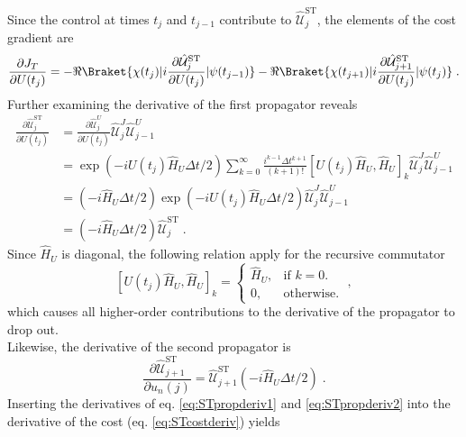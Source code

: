 Since the control at times $t_j$ and $t_{j-1}$ contribute to $\hat{\mathcal{U}}_{j}^{\mathrm{ST}}$, the elements of the cost gradient are
\begin{equation}
	\frac{\partial J_T}{\partial U (t_j)} = - \Re \Braket{\chi (t_j) | i  \frac{\partial \hat{\mathcal{U}}_{j}^{\mathrm{ST}}}{\partial U (t_j)} | \psi (t_{j-1})} - \Re \Braket{\chi (t_{j+1}) | i \frac{ \partial \hat{\mathcal{U}}_{j+1}^{\mathrm{ST}}}{\partial U (t_j)} | \psi (t_{j})} \; . \label{eq:STcostderiv}
\end{equation}
Further examining the derivative of the first propagator reveals
\begin{align}
	\frac{\partial \hat{\mathcal{U}}_{j}^{\mathrm{ST}}}{\partial U (t_j)} &=  \frac{\partial \hat{\mathcal{U}}_{j}^{U}}{\partial U (t_j)} \hat{\mathcal{U}}_{j}^{J} \hat{\mathcal{U}}_{j-1}^{U} \nonumber \\
	&=  \exp \left( -i U (t_j) \hat{H}_U  \Delta t /2 \right)  \sum_{k = 0}^{\infty }  \frac{i^{k-1} \Delta t^{k+1}}{(k+1)!} \left[ U (t_j) \hat{H}_U  ,  \hat{H}_U \right]_k \hat{\mathcal{U}}_{j}^{J} \hat{\mathcal{U}}_{j-1}^{U} \nonumber \\
	&= \left( -i \hat{H}_U \Delta t /2 \right) \exp \left( -i U(t_j) \hat{H}_U  \Delta t /2 \right)   \hat{\mathcal{U}}_{j}^{J} \hat{\mathcal{U}}_{j-1}^{U} \nonumber \\
	&= \left( -i \hat{H}_U \Delta t /2 \right) \hat{\mathcal{U}}_{j}^{\mathrm{ST}} \; . \label{eq:STpropderiv1}
\end{align}
Since $\hat{H}_U$ is diagonal, the following relation apply for the recursive commutator 
\begin{equation}
	\left[ U (t_j) \hat{H}_U  ,  \hat{H}_U \right]_k =  
	\begin{cases}
    	\hat{H}_U, & \text{if $k = 0$}.\\
    	0, & \text{otherwise}.
  	\end{cases} \; ,
\end{equation}  
which causes all higher-order contributions to the derivative of the propagator to drop out.\\
Likewise, the derivative of the second propagator is
\begin{equation}
	\frac{\partial \hat{\mathcal{U}}_{j+1}^{\mathrm{ST}}}{\partial u_n (j)} =  \hat{\mathcal{U}}_{j+1}^{\mathrm{ST}} \left( -i \hat{H}_U \Delta t /2 \right) \; . \label{eq:STpropderiv2}
\end{equation}
Inserting the derivatives of eq. \eqref{eq:STpropderiv1} and \eqref{eq:STpropderiv2} into the derivative of the cost (eq. \eqref{eq:STcostderiv}) yields
